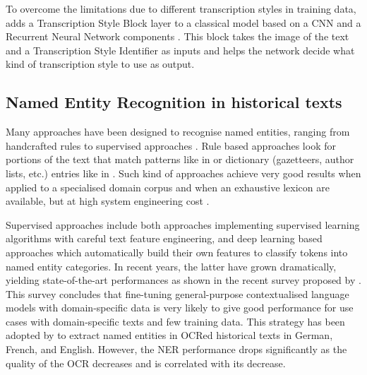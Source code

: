 To overcome the limitations due to different transcription styles in training data, \peroocr adds a Transcription Style Block layer to a classical model based on a CNN and a Recurrent Neural Network components \cite{kohut2021ts}.
This block takes the image of the text and a Transcription Style Identifier as inputs and helps the network decide what kind of transcription style to use as output.





\subsection{Named Entity Recognition in historical texts}
\label{subsection:stoa-ner-on-historical-texts}

Many approaches have been designed to recognise named entities, ranging from handcrafted rules to supervised approaches \cite{nadeau2007}.
Rule based approaches look for portions of the text that match patterns like in \cite{bell2020automated,nouvel2011} or dictionary (gazetteers, author lists, etc.) entries like in \cite{mansouri2008,maurel2011}.
Such kind of approaches achieve very good results when applied to a specialised domain corpus and when an exhaustive lexicon are available, but at high system engineering cost \cite{nadeau2007}. 

Supervised approaches include both approaches implementing supervised learning algorithms with careful text feature engineering, and deep learning based approaches which automatically build their own features to classify tokens into named entity categories.
In recent years, the latter have grown dramatically, yielding state-of-the-art performances as shown in the recent survey proposed by \cite{li2020}. This survey concludes that fine-tuning general-purpose contextualised language models with domain-specific data is very likely to give good performance for use cases with domain-specific texts and few training data. This strategy has been adopted by \cite{Labusch2020NamedED} to extract named entities in OCRed historical texts in German, French, and English. However, the NER performance drops significantly as the quality of the OCR decreases and is correlated with its decrease.

